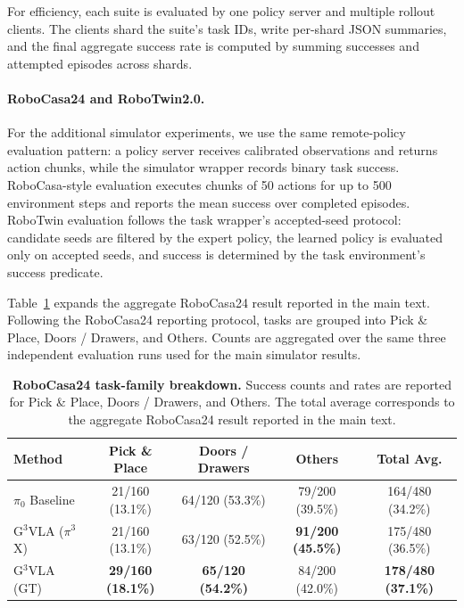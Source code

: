 For efficiency, each suite is evaluated by one policy server and multiple rollout clients. The clients shard the suite's task IDs, write per-shard JSON summaries, and the final aggregate success rate is computed by summing successes and attempted episodes across shards.

\paragraph{RoboCasa24 and RoboTwin2.0.}
For the additional simulator experiments, we use the same remote-policy evaluation pattern: a policy server receives calibrated observations and returns action chunks, while the simulator wrapper records binary task success. RoboCasa-style evaluation executes chunks of 50 actions for up to 500 environment steps and reports the mean success over completed episodes. RoboTwin evaluation follows the task wrapper's accepted-seed protocol: candidate seeds are filtered by the expert policy, the learned policy is evaluated only on accepted seeds, and success is determined by the task environment's success predicate.

Table~\ref{tab:appendix_robocasa_breakdown} expands the aggregate RoboCasa24 result reported in
the main text. Following the RoboCasa24 reporting protocol, tasks are grouped into Pick \& Place,
Doors / Drawers, and Others. Counts are aggregated over the same three independent evaluation
runs used for the main simulator results.

\begin{table}[H]
\centering
\small
\setlength{\tabcolsep}{5pt}
\begin{tabular}{lcccc}
\toprule
\textbf{Method} & \textbf{Pick \& Place} & \textbf{Doors / Drawers} & \textbf{Others} & \textbf{Total Avg.} \\
\midrule
$\pi_0$ Baseline
& 21/160 (13.1\%) & 64/120 (53.3\%) & 79/200 (39.5\%) & 164/480 (34.2\%) \\
G$^3$VLA ($\pi^3$X)
& 21/160 (13.1\%) & 63/120 (52.5\%) & \textbf{91/200 (45.5\%)} & 175/480 (36.5\%) \\
G$^3$VLA (GT)
& \textbf{29/160 (18.1\%)} & \textbf{65/120 (54.2\%)} & 84/200 (42.0\%) & \textbf{178/480 (37.1\%)} \\
\bottomrule
\end{tabular}
\caption{\textbf{RoboCasa24 task-family breakdown.}
Success counts and rates are reported for Pick \& Place, Doors / Drawers, and Others. The total
average corresponds to the aggregate RoboCasa24 result reported in the main text.}
\label{tab:appendix_robocasa_breakdown}
\end{table}

